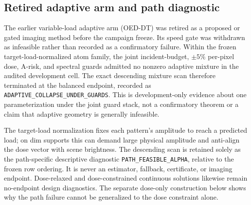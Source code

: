 \documentclass[10pt]{article}
\begin{document}
\subsection{Retired adaptive arm and path diagnostic}
\label{sec:s-retired-path}
The earlier variable-load adaptive arm (\textsc{OED-DT}) was retired as a
proposed or gated imaging method before the campaign freeze. Its speed gate was
withdrawn as infeasible rather than recorded as a confirmatory failure. Within
the frozen target-load-normalized atom family, the joint incident-budget,
$\pm5\%$ per-pixel dose, A-risk, and spectral guards admitted no nonzero
adaptive mixture in the audited development cell. The exact descending mixture
scan therefore terminated at the balanced endpoint, recorded as
\texttt{ADAPTIVE\_COLLAPSE\_UNDER\_GUARDS}. This is development-only evidence
about one parameterization under the joint guard stack, not a confirmatory
theorem or a claim that adaptive geometry is generally infeasible.

The target-load normalization fixes each pattern's amplitude to reach a
predicted load; on dim supports this can demand large physical amplitude and
anti-align the dose vector with scene brightness. The descending scan is
retained solely as the path-specific descriptive diagnostic
\texttt{PATH\_FEASIBLE\_ALPHA}, relative to the frozen row ordering. It is
never an estimator, fallback, certificate, or imaging endpoint. Dose-relaxed
and dose-constrained continuous solutions likewise remain no-endpoint design
diagnostics. The separate dose-only construction below shows why the path
failure cannot be generalized to the dose constraint alone.
\end{document}
